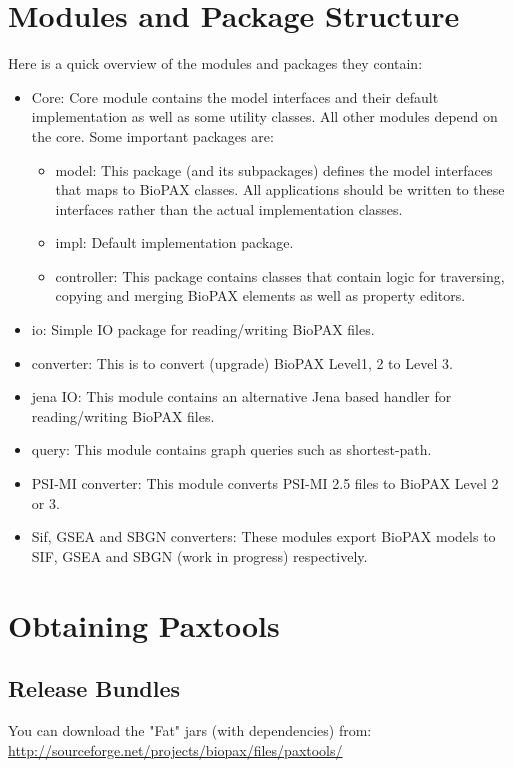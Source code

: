 \documentclass{tufte-book}
\begin{document}
\section{Modules and Package Structure}
Here is a quick overview of the modules and packages they contain:
\begin{itemize}

\item Core: Core module contains the model interfaces and their default implementation as well as some utility classes. All other modules depend on the core. Some important packages are:
	\begin{itemize}
	\item model: This package (and its subpackages) defines the model interfaces that maps to BioPAX classes. All applications should be written to these interfaces rather than the actual implementation classes.
	\item impl: Default implementation package.
	\item controller: This package contains classes that contain logic for traversing, copying and merging BioPAX elements as well as property editors.
	\end{itemize}
\item io: Simple IO package for reading/writing BioPAX files.
 \item converter: This is to convert (upgrade) BioPAX Level1, 2 to Level 3.
\item jena IO: This module contains an alternative Jena based handler for reading/writing BioPAX files.
\item query: This module contains graph queries such as shortest-path.
\item PSI-MI converter: This module converts PSI-MI 2.5 files to BioPAX Level 2 or 3.
\item Sif, GSEA and SBGN converters: These modules export BioPAX models to SIF, GSEA and SBGN (work in progress) respectively.
\end{itemize}

\section{Obtaining Paxtools}

\subsection{Release Bundles}

You can download the "Fat" jars (with dependencies) from:
	\url{http://sourceforge.net/projects/biopax/files/paxtools/}
\end{document}
